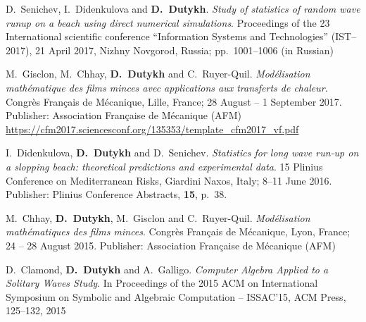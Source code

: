 \begin{etaremune}
  \item D.~Senichev, I.~Didenkulova and \textbf{D.~Dutykh}. \textit{Study of statistics of random wave runup on a beach using direct numerical simulations}. Proceedings of the 23 International scientific conference ``Information Systems and Technologies'' (IST--2017), 21 April 2017, Nizhny Novgorod, Russia; pp.~1001--1006 (in Russian) %
  
  \item M.~Gisclon, M.~Chhay, \textbf{D.~Dutykh} and C.~Ruyer-Quil. \textit{Mod\'elisation math\'ematique des films minces avec applications aux transferts de chaleur}. Congr\`es Fran\c{c}ais de M\'ecanique, Lille, France; 28 August -- 1 September 2017. Publisher: Association Fran\c{c}aise de M\'ecanique (AFM) \\ %
  \url{https://cfm2017.sciencesconf.org/135353/template_cfm2017_vf.pdf}
  

  
  \item I.~Didenkulova, \textbf{D.~Dutykh} and D.~Senichev. \textit{Statistics for long wave run-up on a slopping beach: theoretical predictions and experimental data}. 15 Plinius Conference on Mediterranean Risks, Giardini Naxos, Italy; 8--11 June 2016. Publisher: Plinius Conference Abstracts, \textbf{15}, p.~38. %

  

  
  \item M.~Chhay, \textbf{D.~Dutykh}, M.~Gisclon and C.~Ruyer-Quil. \textit{Mod\'elisation math\'ematiques des films minces}. Congr\`es Fran\c{c}ais de M\'ecanique, Lyon, France; 24 -- 28 August 2015. Publisher: Association Fran\c{c}aise de M\'ecanique (AFM) \\ %
  
  \item D.~Clamond, \textbf{D.~Dutykh} and A.~Galligo. \textit{Computer Algebra Applied to a Solitary Waves Study}. In Proceedings of the 2015 ACM on International Symposium on Symbolic and Algebraic Computation -- ISSAC'15, ACM Press, 125--132, 2015 %
  

\end{etaremune}
